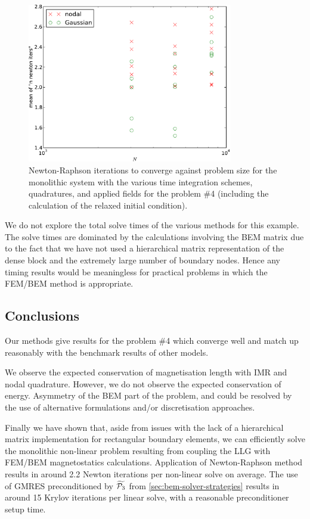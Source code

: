 \begin{figure}
  \centering
  \includegraphics[width=0.8\textwidth]
  {plots/mumag4_monolithic_its/meanofnnewtonitersvsinitialnnode.pdf}
  \caption{Newton-Raphson iterations to converge against problem size
    for the monolithic system with the various time integration schemes, quadratures, and applied fields for the \mumag problem \#4 (including the calculation of the relaxed initial condition).}
  \label{fig:mumag4-newton-iters}
\end{figure}


We do not explore the total solve times of the various methods for this example.
The solve times are dominated by the calculations involving the BEM matrix due to the fact that we have not used a hierarchical matrix representation of the dense block and the extremely large number of boundary nodes.
Hence any timing results would be meaningless for practical problems in which the FEM/BEM method is appropriate.


\subsection{Conclusions}

Our methods give results for the \mumag problem \#4 which converge well and match up reasonably with the benchmark results of other models.

We observe the expected conservation of magnetisation length with IMR and nodal quadrature.
However, we do not observe the expected conservation of energy.
Asymmetry of the BEM part of the problem, and could be resolved by the use of alternative formulations and/or discretisation approaches.

Finally we have shown that, aside from issues with the lack of a hierarchical matrix implementation for rectangular boundary elements, we can efficiently solve the monolithic non-linear problem resulting from coupling the LLG with FEM/BEM magnetostatics calculations.
Application of Newton-Raphson method results in around 2.2 Newton iterations per non-linear solve on average.
The use of GMRES preconditioned by $\widetilde{\mathcal{P}_3}$ from \cref{sec:bem-solver-strategies} results in around 15 Krylov iterations per linear solve, with a reasonable preconditioner setup time.



